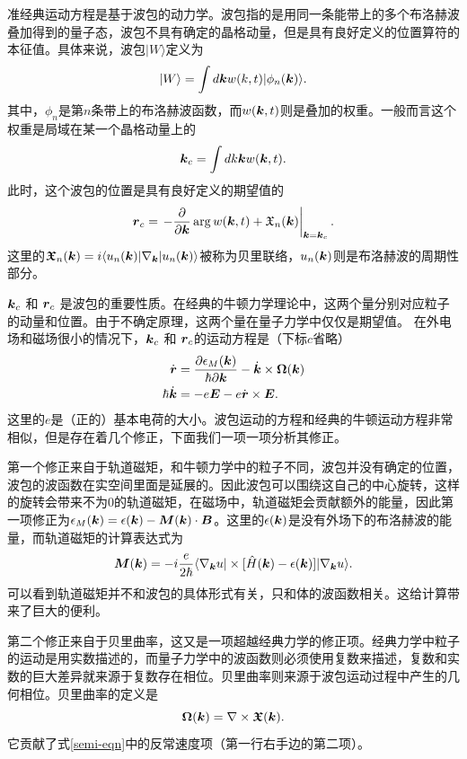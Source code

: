 准经典运动方程是基于波包的动力学。波包指的是用同一条能带上的多个布洛赫波叠加得到的量子态，波包不具有确定的晶格动量，但是具有良好定义的位置算符的本征值。具体来说，波包$|W\rangle$定义为
\begin{equation}
|W\rangle=\int d\boldsymbol{k} w(k, t)|\phi_n(\boldsymbol{k})\rangle.
\end{equation}
其中，$\phi_n$是第$n$条带上的布洛赫波函数，而$w(\boldsymbol{k},t)$则是叠加的权重。一般而言这个权重是局域在某一个晶格动量上的
\begin{equation}
\boldsymbol{k}_c = \int dk \boldsymbol{k} w(\boldsymbol{k},t).
\end{equation}
此时，这个波包的位置是具有良好定义的期望值的
\begin{equation}
\boldsymbol{r}_c = \left. -\frac{\partial}{\partial \boldsymbol{k}} \arg w(\boldsymbol{k}, t) + \mathfrak{X}_n(\boldsymbol{k})\right|_{\boldsymbol{k}=\boldsymbol{k}_c}.\label{semi-rc}
\end{equation}
这里的$\boldsymbol{\mathfrak{X}}_n(\boldsymbol{k})=i \langle u_n(\boldsymbol{k})|\nabla_{\boldsymbol{k}}|u_n(\boldsymbol{k}) \rangle$被称为贝里联络，$u_n(\boldsymbol{k})$则是布洛赫波的周期性部分。

$\boldsymbol{k}_c$ 和 $\boldsymbol{r}_c$ 是波包的重要性质。在经典的牛顿力学理论中，这两个量分别对应粒子的动量和位置。由于不确定原理，这两个量在量子力学中仅仅是期望值。 在外电场和磁场很小的情况下，$\boldsymbol{k}_c$ 和 $\boldsymbol{r}_c$的运动方程是（下标$c$省略）
\begin{align}
	\dot{\boldsymbol{r}} &= \frac{\partial \epsilon_M(\boldsymbol{k})}{\hbar\partial \boldsymbol{k}}-\dot{\boldsymbol{k}}\times\boldsymbol{\Omega}(\boldsymbol{k})\nonumber\\
	\hbar\dot{\boldsymbol{k}} &= -e\boldsymbol{E}-e\dot{\boldsymbol{r}}\times\boldsymbol{E}.\label{semi-eqn}
\end{align}
这里的$e$是（正的）基本电荷的大小。波包运动的方程和经典的牛顿运动方程非常相似，但是存在着几个修正，下面我们一项一项分析其修正。

第一个修正来自于轨道磁矩，和牛顿力学中的粒子不同，波包并没有确定的位置，波包的波函数在实空间里面是延展的。因此波包可以围绕这自己的中心旋转，这样的旋转会带来不为0的轨道磁矩，在磁场中，轨道磁矩会贡献额外的能量，因此第一项修正为$\epsilon_M(\boldsymbol{k})=\epsilon(\boldsymbol{k})-\boldsymbol{M}(\boldsymbol{k})\cdot\boldsymbol{B}$。这里的$\epsilon(\boldsymbol{k})$是没有外场下的布洛赫波的能量，而轨道磁矩的计算表达式为
\begin{equation}
\boldsymbol{M}(\boldsymbol{k}) = -i\frac{e}{2\hbar}\langle\nabla_{\boldsymbol{k}}u|\times [\hat{H}(\boldsymbol{k})-\epsilon(\boldsymbol{k})]|\nabla_{\boldsymbol{k}}u\rangle.
\end{equation}
可以看到轨道磁矩并不和波包的具体形式有关，只和体的波函数相关。这给计算带来了巨大的便利。

第二个修正来自于贝里曲率，这又是一项超越经典力学的修正项。经典力学中粒子的运动是用实数描述的，而量子力学中的波函数则必须使用复数来描述，复数和实数的巨大差异就来源于复数存在相位。贝里曲率则来源于波包运动过程中产生的几何相位。贝里曲率的定义是
\begin{equation}
\boldsymbol{\Omega}(\boldsymbol{k}) = \nabla\times\boldsymbol{\mathfrak{X}}(\boldsymbol{k}).
\end{equation}
它贡献了式\ref{semi-eqn}中的反常速度项（第一行右手边的第二项）。

